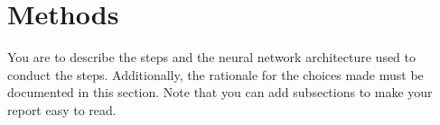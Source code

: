 \section{Methods}
\label{sec:method}

\textbf{}
You are to describe the steps and the neural network architecture used to conduct the steps.
Additionally, the rationale for the choices made must be documented in this section.
Note that you can add subsections to make your report easy to read.

\mylipsum

\mylipsum

\mylipsum

\mylipsum

\mylipsum

\mylipsum

